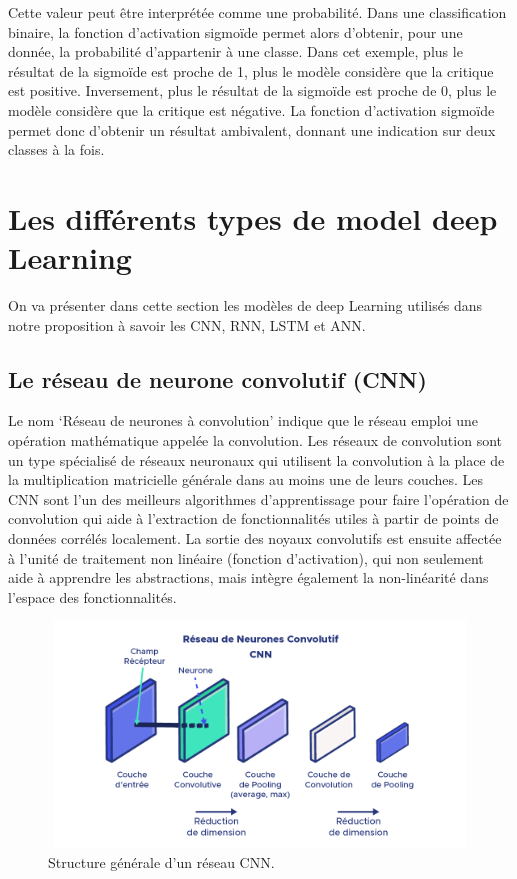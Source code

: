 Cette valeur peut être interprétée comme une probabilité. Dans une classification binaire, la fonction d’activation sigmoïde permet alors d’obtenir, pour une donnée, la probabilité d’appartenir à une classe.
Dans cet exemple, plus le résultat de la sigmoïde est proche de 1, plus le modèle considère que la critique est positive. Inversement, plus le résultat de la sigmoïde est proche de 0, plus le modèle considère que la critique est négative.
La fonction d’activation sigmoïde permet donc d’obtenir un résultat ambivalent, donnant une indication sur deux classes à la fois.

\section{Les différents types de model deep Learning}
On va présenter dans cette section les modèles de deep Learning utilisés dans notre proposition à savoir les CNN, RNN, LSTM et ANN.

\subsection{Le réseau de neurone convolutif (CNN) }
Le nom ‘Réseau de neurones à convolution’ indique que le réseau emploi une opération mathématique appelée la convolution.
 Les réseaux de convolution sont un type spécialisé de réseaux neuronaux qui utilisent la convolution à la place de la multiplication matricielle générale dans au moins une de leurs couches.
 Les CNN sont l’un des meilleurs algorithmes d’apprentissage pour faire l’opération de convolution qui aide à l’extraction de fonctionnalités utiles à partir de points de données corrélés localement.
 La sortie des noyaux convolutifs est ensuite affectée à l’unité de traitement non linéaire (fonction d’activation), qui non seulement aide à apprendre les abstractions, mais intègre également la non-linéarité dans l’espace des fonctionnalités.

\begin{figure}[!h]
\centering
\includegraphics[width=13cm, height=6cm]{Images/illu_DenseNet-09.png}
\caption{Structure générale d’un réseau CNN.}
\label{fig:14}
\end{figure}
\newpage
